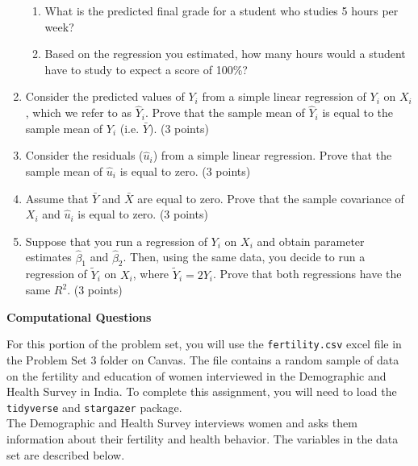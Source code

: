 \documentclass[11pt]{article}
\begin{document}
\begin{onehalfspacing}
\begin{enumerate}
\begin{enumerate}
	\item What is the predicted final grade for a student who studies 5 hours per week?

	\item Based on the regression you estimated, how many hours would a student have to study to expect a score of 100\%?

\end{enumerate}

\item Consider the predicted values of $Y_i$ from a simple linear regression of $Y_i$ on $X_i$, which we refer to as $\hat{Y}_i$. Prove that the sample mean of $\hat{Y}_i$ is equal to the sample mean of $Y_i$ (i.e. $\bar{Y}$). (3 points)

\item Consider the residuals ($\hat{u}_i$) from a simple linear regression. Prove that the sample mean of $\hat{u}_i$ is equal to zero. (3 points)

\item Assume that $\bar{Y}$ and $\bar{X}$ are equal to zero. Prove that the sample covariance of $X_i$ and $\hat{u}_i$ is equal to zero. (3 points)

\item Suppose that you run a regression of $Y_i$ on $X_i$ and obtain parameter estimates $\hat{\beta}_1$ and $\hat{\beta}_2$. Then, using the same data, you decide to run a regression of $\tilde{Y}_i$ on $X_i$, where $\tilde{Y}_i = 2Y_i$. Prove that both regressions have the same $R^2$. (3 points)

\end{enumerate}

\newpage 

\begin{center}
\textbf{Computational Questions} \bigskip
\end{center}

\noindent For this portion of the problem set, you will use the \texttt{fertility.csv} excel file in the Problem Set 3 folder on Canvas. The file contains a random sample of data on the fertility and education of women interviewed in the Demographic and Health Survey in India. To complete this assignment, you will need to load the \texttt{tidyverse} and \texttt{stargazer} package. \\

\noindent The Demographic and Health Survey interviews women and asks them information about their fertility and health behavior. The variables in the data set are described below.\\


\end{onehalfspacing}
\end{document}
